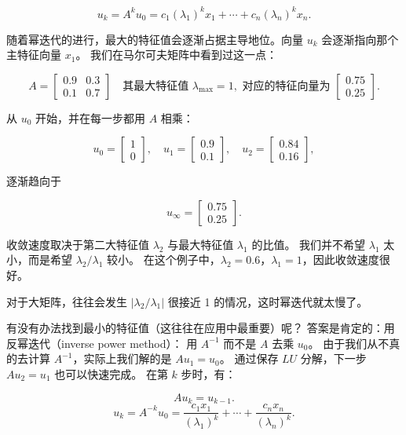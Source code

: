 \[
u_k = A^k u_0 = c_1 (\lambda_1)^k x_1 + \cdots + c_n (\lambda_n)^k x_n. \tag{10}
\]

随着幂迭代的进行，最大的特征值会逐渐占据主导地位。向量 $u_k$ 会逐渐指向那个主特征向量 $x_1$。  
我们在马尔可夫矩阵中看到过这一点：

\[
A = \begin{bmatrix}
0.9 & 0.3 \\
0.1 & 0.7
\end{bmatrix}
\quad \text{其最大特征值 } \lambda_{\max} = 1, \text{ 对应的特征向量为 }
\begin{bmatrix} 0.75 \\ 0.25 \end{bmatrix}.
\]

从 $u_0$ 开始，并在每一步都用 $A$ 相乘：

\[
u_0 = \begin{bmatrix}1 \\ 0\end{bmatrix}, \quad
u_1 = \begin{bmatrix}0.9 \\ 0.1\end{bmatrix}, \quad
u_2 = \begin{bmatrix}0.84 \\ 0.16\end{bmatrix},
\]

逐渐趋向于

\[
u_\infty = \begin{bmatrix}0.75 \\ 0.25\end{bmatrix}.
\]

\medskip

收敛速度取决于第二大特征值 $\lambda_2$ 与最大特征值 $\lambda_1$ 的比值。  
我们并不希望 $\lambda_1$ 太小，而是希望 $\lambda_2/\lambda_1$ 较小。  
在这个例子中，$\lambda_2 = 0.6$，$\lambda_1 = 1$，因此收敛速度很好。  

对于大矩阵，往往会发生 $|\lambda_2/\lambda_1|$ 很接近 1 的情况，这时幂迭代就太慢了。

\medskip

有没有办法找到最小的特征值（这往往在应用中最重要）呢？  
答案是肯定的：用反幂迭代（inverse power method）：  
用 $A^{-1}$ 而不是 $A$ 去乘 $u_0$。  
由于我们从不真的去计算 $A^{-1}$，实际上我们解的是 $Au_1 = u_0$。  
通过保存 $LU$ 分解，下一步 $Au_2 = u_1$ 也可以快速完成。  
在第 $k$ 步时，有：

\[
Au_k = u_{k-1}.
\]
\[
u_k = A^{-k} u_0 = \frac{c_1 x_1}{(\lambda_1)^k} + \cdots + \frac{c_n x_n}{(\lambda_n)^k}. \tag{11}
\]

